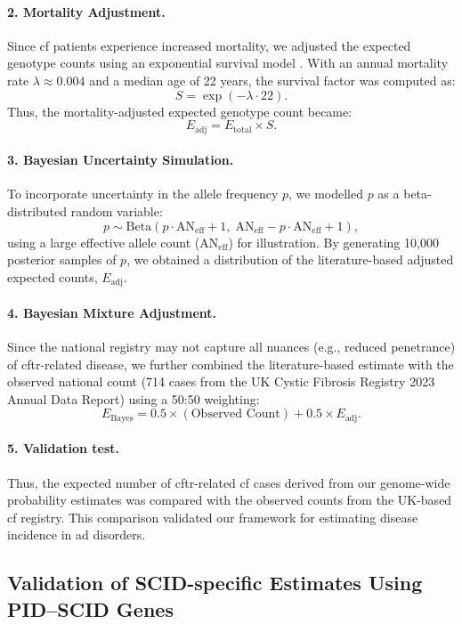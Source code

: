 \paragraph{2. Mortality Adjustment.}
Since \ac{cf} patients experience increased mortality, we adjusted the expected genotype counts using an exponential survival model \cite{naito2023uk, castellani2013cftr2, Grasemann2023cftr}. With an annual mortality rate \(\lambda \approx 0.004\) and a median age of 22 years, the survival factor was computed as:
\[
S = \exp(-\lambda \cdot 22).
\]
Thus, the mortality-adjusted expected genotype count became:
\[
E_{\text{adj}} = E_{\text{total}} \times S.
\]

\paragraph{3. Bayesian Uncertainty Simulation.}
To incorporate uncertainty in the allele frequency \( p \), we modelled \( p \) as a beta-distributed random variable:
\[
p \sim \mathrm{Beta}(p \cdot \text{AN}_{\text{eff}} + 1,\; \text{AN}_{\text{eff}} - p \cdot \text{AN}_{\text{eff}} + 1),
\]
using a large effective allele count (\(\text{AN}_{\text{eff}}\)) for illustration. By generating 10,000 posterior samples of \( p \), we obtained a distribution of the literature-based adjusted expected counts, \(E_{\text{adj}}\).

\paragraph{4. Bayesian Mixture Adjustment.}
Since the national registry may not capture all nuances (e.g., reduced penetrance) of \ac{cftr}-related disease, we further combined the literature-based estimate with the observed national count (714 cases from the UK Cystic Fibrosis Registry 2023 Annual Data Report) using a 50:50 weighting:
\[
E_{\text{Bayes}} = 0.5 \times (\text{Observed Count}) + 0.5 \times E_{\text{adj}}.
\]

\paragraph{5. Validation test.}
Thus, the expected number of \ac{cftr}-related \ac{cf} cases derived from our genome-wide probability estimates was compared with the observed counts from the UK-based \ac{cf} registry. This comparison validated our framework for estimating disease incidence in \ac{ad} disorders.


\subsection{Validation of SCID-specific Estimates Using PID–SCID Genes}

